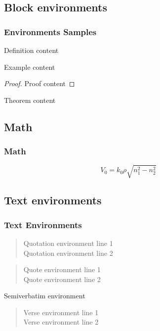 \documentclass[aspectratio=169]{beamer}
\begin{document}
\subsection{Block environments}

\begin{frame}[label=environments]\frametitle{Environments Samples}
    
	\begin{definition}
	Definition content
	\end{definition}
  
	\begin{example}
	Example content
	\end{example}

	\begin{proof}
	Proof content
	\end{proof}  
    
	\begin{theorem}
	Theorem content
	\end{theorem}

\end{frame}


\subsection{Math}

\begin{frame}[label=math]\frametitle{Math}
    
\begin{equation}
	V_0 = k_0 \rho \sqrt{n_1^2 - n_2^2}
\end{equation}

\end{frame}


\subsection{Text environments}

\begin{frame}[label=text]\frametitle{Text Environments}
    
\begin{quotation}
  Quotation environment line 1\\
  Quotation environment line 2
\end{quotation}
\begin{quote}
  Quote environment line 1\\
  Quote environment line 2
\end{quote}
\begin{semiverbatim}
  Semiverbatim environment
\end{semiverbatim}
\begin{verse}
  Verse environment line 1\\
  Verse environment line 2
\end{verse}  

\end{frame}
\end{document}
